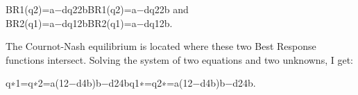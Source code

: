 BR1(q2)=a−dq22bBR1(q2)=a−dq22b and BR2(q1)=a−dq12bBR2(q1)=a−dq12b.

The Cournot-Nash equilibrium is located where these two Best Response functions intersect. Solving the system of two equations and two unknowns, I get:

q∗1=q∗2=a(12−d4b)b−d24bq1∗=q2∗=a(12−d4b)b−d24b.

